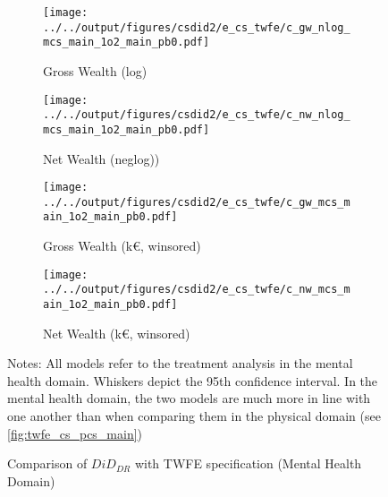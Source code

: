 \begin{figure}[htb!]
    \centering
    \begin{subfigure}{0.495\textwidth}
        \caption{Gross Wealth (log)}
        \texttt{[image: ../../output/figures/csdid2/e\_cs\_twfe/c\_gw\_nlog\_mcs\_main\_1o2\_main\_pb0.pdf]}
        \label{sfig:olscsgwnlogmcsmain}
    \end{subfigure}
    \begin{subfigure}{0.495\textwidth}
        \caption{Net Wealth (neglog))}
        \texttt{[image: ../../output/figures/csdid2/e\_cs\_twfe/c\_nw\_nlog\_mcs\_main\_1o2\_main\_pb0.pdf]}
        \label{sfig:olscsnwnlogmcsmain}
    \end{subfigure}
    \begin{subfigure}{0.495\textwidth}
        \caption{Gross Wealth (k€, winsored)}
        \texttt{[image: ../../output/figures/csdid2/e\_cs\_twfe/c\_gw\_mcs\_main\_1o2\_main\_pb0.pdf]}
        \label{sfig:olscsgwmcsmain}
    \end{subfigure}
    \begin{subfigure}{0.495\textwidth}
        \caption{Net Wealth (k€, winsored)}
        \texttt{[image: ../../output/figures/csdid2/e\_cs\_twfe/c\_nw\_mcs\_main\_1o2\_main\_pb0.pdf]}
        \label{sfig:olscsnwmcsmain}
    \end{subfigure}
    \caption{Comparison of $DiD_{DR}$ with TWFE specification (Mental Health Domain)} 
    \par \footnotesize \raggedright
    \vspace{5pt} 
    Notes: All models refer to the treatment analysis in the mental health domain. 
    Whiskers depict the 95th confidence interval. 
    In the mental health domain, the two models are much more in line with one another than when comparing them in the
    physical domain (see \cref{fig:twfe_cs_pcs_main})
    \label{fig:twfe_cs_mcs_main}
\end{figure}